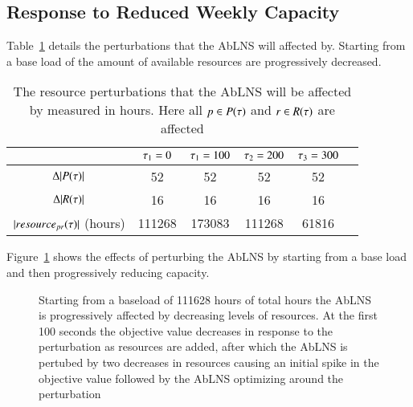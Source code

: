 \subsection{Response to Reduced Weekly Capacity}\label{sec:results:reduced_weekly_capacity}
Table~\ref{tab:resources:resource-subtraction} details the perturbations that the
AbLNS will affected by. Starting from a base load of the amount of available
resources are progressively decreased.
\begin{table}[H]
	\centering
	\begin{tabular}{cccccc}
	\toprule
	                                    & $\tau_1 = 0$ & $\tau_1 = 100$ & $\tau_2 = 200$ & $\tau_3 = 300$ \\ \midrule
	$\Delta |P(\tau)|$               & 52                   & 52                     & 52                     & 52                     \\ \midrule
	$\Delta |R(\tau)|$             & 16                   & 16                     & 16                     & 16                     \\ \midrule
	$ |resource_{pr}(\tau)|$ (hours)& 111268               & 173083                 & 111268                 & 61816                  \\ \bottomrule
	\end{tabular}
	\caption{The resource perturbations that the AbLNS will be affected by measured in hours. Here all $p \in P(\tau)$ and $r \in R(\tau)$ are 
		affected}\label{tab:resources:resource-subtraction}
\end{table}

Figure~\ref{fig:responses:resource-subtraction} shows the effects of perturbing
the AbLNS by starting from a base load  and then progressively reducing
capacity.

\begin{figure}[H]%
	\centering
	\resizebox{10cm}{!}{
		
	}
	\caption{Starting from a baseload of 111628 hours of total hours the AbLNS is 
	progressively affected by decreasing levels of resources. At the first 
	100 seconds the objective value decreases in response to the perturbation
	as resources are added, after which the AbLNS is pertubed by two decreases
	in resources causing an initial spike in the objective value followed 
	by the AbLNS optimizing around the perturbation
	}\label{fig:responses:resource-subtraction}
\end{figure}

